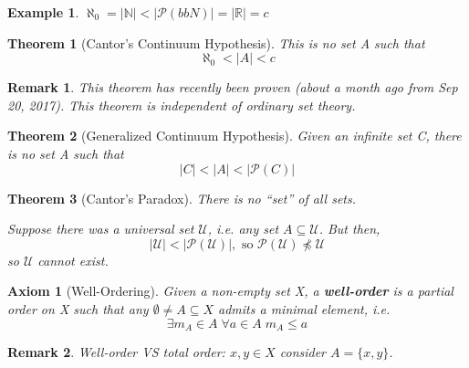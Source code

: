 \documentclass[11pt, oneside]{book}
\theoremstyle{break}
\newtheorem{thm}{Theorem}[section]
\newtheorem*{remark}{Remark}
\newtheorem{eg}{Example}[section]
\newtheorem{axiom}{Axiom}[section]
\newcommand{\bb}[1]{\mathbb{#1}}			%
\begin{document}
\begin{eg}
	$\aleph_0 = |\bb{N}| < |\mathcal{P}(bb{N})| = |\bb{R}| = c$
\end{eg}

\begin{thm}[Cantor's Continuum Hypothesis]
	This is no set A such that
 	\begin{equation}
 		\aleph_0 < |A| < c
 	\end{equation}
\end{thm}

\begin{remark}
	This theorem has recently been proven (about a month ago from Sep 20, 2017). This theorem is independent of ordinary set theory.
\end{remark}

\begin{thm}[Generalized Continuum Hypothesis]
	Given an infinite set C, there is no set A such that
	\begin{equation}
		|C| < |A| < |\mathcal{P}(C)|
	\end{equation}
\end{thm}

\begin{thm}[Cantor's Paradox]
	There is no ``set'' of all sets.

	Suppose there was a universal set $\mathcal{U}$, i.e. any set $A \subseteq \mathcal{U}$. But then,
	\begin{equation}
		|\mathcal{U}| < |\mathcal{P}(\mathcal{U})|, \text{ so } \mathcal{P}(\mathcal{U}) \not\preceq \mathcal{U}
	\end{equation}
	so $\mathcal{U}$ cannot exist.
\end{thm}

\begin{axiom}[Well-Ordering]
	\label{axiom:well_order}
	Given a non-empty set X, a \textbf{well-order} is a partial order on X such that any $\emptyset \neq A \subseteq X$ admits a minimal element, i.e.
	\begin{equation}
		\exists m_A \in A \; \forall a \in A \; m_A \leq a
	\end{equation}
\end{axiom}

\begin{remark}
	Well-order VS total order: $x, y \in X$ consider $A = \{x, y\}$.
\end{remark}
\end{document}
